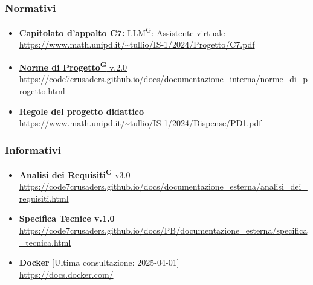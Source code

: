     \subsubsection{Normativi}
        \begin{itemize}
            \item \textbf{Capitolato d'appalto C7:} \href{https://code7crusaders.github.io/docs/PB/documentazione_interna/glossario.html#llm-large-language-model}{LLM\textsuperscript{G}}: Assistente virtuale \\ \url{https://www.math.unipd.it/~tullio/IS-1/2024/Progetto/C7.pdf}
            \item \href{https://code7crusaders.github.io/docs/PB/documentazione_interna/glossario.html#norme-di-progetto}{\textbf{Norme di Progetto\textsuperscript{G}} v.2.0} \\ \url{https://code7crusaders.github.io/docs/documentazione_interna/norme_di_progetto.html}
            \item \textbf{Regole del progetto didattico} \\ \url{https://www.math.unipd.it/~tullio/IS-1/2024/Dispense/PD1.pdf}
        \end{itemize}
    \subsubsection{Informativi}
        \begin{itemize}
            \item \href{https://code7crusaders.github.io/docs/PB/documentazione_interna/glossario.html#analisi-dei-requisiti}{\textbf{Analisi dei Requisiti\textsuperscript{G}} v3.0} \\ \url{https://code7crusaders.github.io/docs/documentazione_esterna/analisi_dei_requisiti.html}
            \item \textbf{Specifica Tecnice v.1.0} \\ \url{https://code7crusaders.github.io/docs/PB/documentazione_esterna/specifica_tecnica.html}
            \item \textbf{Docker} [Ultima consultazione: 2025-04-01] \\ \url{https://docs.docker.com/} 
        \end{itemize}